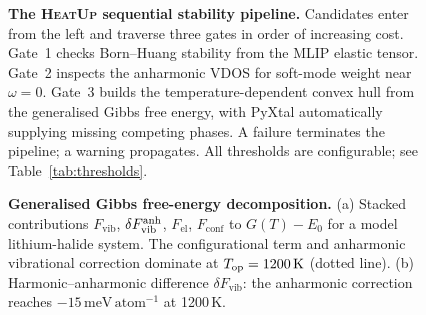 \documentclass[twocolumn,10pt]{article}
\newcommand{\Fvib}{F_{\mathrm{vib}}}
\newcommand{\Fel}{F_{\mathrm{el}}}
\newcommand{\Fconf}{F_{\mathrm{conf}}}
\newcommand{\meVat}{\,\mathrm{meV\,atom^{-1}}}
\newcommand{\tp}{\textsc{HeatUp}}
\begin{document}

\begin{figure}[ht]
\centering
{}
\caption{\textbf{The \tp{} sequential stability pipeline.}
  Candidates enter from the left and traverse three gates in order of increasing
  cost.
  Gate~1 checks Born--Huang stability from the MLIP elastic tensor.
  Gate~2 inspects the anharmonic VDOS for soft-mode weight near $\omega=0$.
  Gate~3 builds the temperature-dependent convex hull from the generalised Gibbs
  free energy, with PyXtal automatically supplying missing competing phases.
  A failure terminates the pipeline; a warning propagates.
  All thresholds are configurable; see Table~\ref{tab:thresholds}.}
\label{fig:pipeline}
\end{figure}

\begin{figure}[ht]
\centering
{}
\caption{\textbf{Generalised Gibbs free-energy decomposition.}
  (a) Stacked contributions $\Fvib$, $\delta\Fvib^{\rm anh}$, $\Fel$, $\Fconf$
  to $G(T)-E_0$ for a model lithium-halide system.
  The configurational term and anharmonic vibrational correction dominate at
  $T_{\rm op} = 1200\,\mathrm{K}$ (dotted line).
  (b) Harmonic--anharmonic difference $\delta\Fvib$: the anharmonic correction
  reaches $-15\meVat$ at 1200\,K.}
\label{fig:gibbs}
\end{figure}
\end{document}
